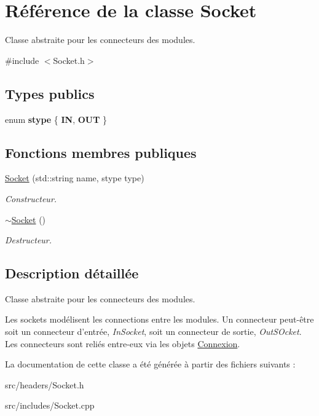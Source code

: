 \hypertarget{classSocket}{\section{Référence de la classe Socket}
\label{classSocket}
}


Classe abstraite pour les connecteurs des modules.  




{\ttfamily \#include $<$Socket.\-h$>$}

\subsection*{Types publics}
\begin{DoxyCompactItemize}
\item 
enum {\bfseries stype} \{ {\bfseries I\-N}, 
{\bfseries O\-U\-T}
 \}
\end{DoxyCompactItemize}
\subsection*{Fonctions membres publiques}
\begin{DoxyCompactItemize}
\item 
\hypertarget{classSocket_a008135f0646e48310061fe84b078dc81}{\hyperlink{classSocket_a008135f0646e48310061fe84b078dc81}{Socket} (std\-::string name, stype type)}\label{classSocket_a008135f0646e48310061fe84b078dc81}

\begin{DoxyCompactList}\small\item\em Constructeur. \end{DoxyCompactList}\item 
\hypertarget{classSocket_aeac4eb6379a543d38ed88977d3b6630a}{\hyperlink{classSocket_aeac4eb6379a543d38ed88977d3b6630a}{$\sim$\-Socket} ()}\label{classSocket_aeac4eb6379a543d38ed88977d3b6630a}

\begin{DoxyCompactList}\small\item\em Destructeur. \end{DoxyCompactList}\end{DoxyCompactItemize}


\subsection{Description détaillée}
Classe abstraite pour les connecteurs des modules. 

Les sockets modélisent les connections entre les modules. Un connecteur peut-\/être soit un connecteur d'entrée, {\itshape In\-Socket}, soit un connecteur de sortie, {\itshape Out\-S\-Ocket}. Les connecteurs sont reliés entre-\/eux via les objets \hyperlink{classConnexion}{Connexion}. 

La documentation de cette classe a été générée à partir des fichiers suivants \-:\begin{DoxyCompactItemize}
\item 
src/headers/Socket.\-h\item 
src/includes/Socket.\-cpp\end{DoxyCompactItemize}
